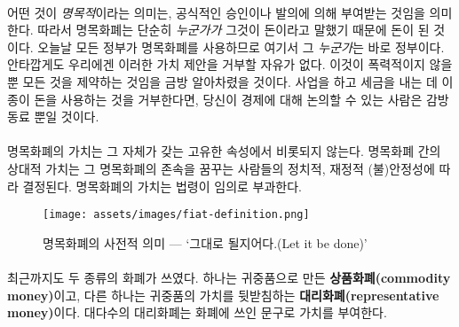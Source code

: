 \paragraph{}
어떤 것이 \textit{명목적}이라는 의미는, 공식적인 승인이나 발의에 의해 부여받는 것임을 의미한다. 
따라서 명목화폐는 단순히 \textit{누군가가} 그것이 돈이라고 말했기 때문에 돈이 된 것이다. 
오늘날 모든 정부가 명목화폐를 사용하므로 여기서 그 \textit{누군가}는 바로 정부이다. 
안타깝게도 우리에겐 이러한 가치 제안을 거부할 자유가 없다.
이것이 폭력적이지 않을 뿐 모든 것을 제약하는 것임을 금방 알아차렸을 것이다.
사업을 하고 세금을 내는 데 이 종이 돈을 사용하는 것을 거부한다면,
당신이 경제에 대해 논의할 수 있는 사람은 감방 동료 뿐일 것이다.

\begin{comment}
	The value of fiat money does not stem from its inherent properties. How
	good a certain type of fiat money is, is only correlated to the
	political and fiscal (in)stability of those who dream it into existence.
	Its value is imposed by decree, arbitrarily.
\end{comment}

\paragraph{}
명목화폐의 가치는 그 자체가 갖는 고유한 속성에서 비롯되지 않는다.
명목화폐 간의 상대적 가치는 그 명목화폐의 존속을 꿈꾸는 사람들의 정치적, 재정적 (불)안정성에 따라 결정된다.
명목화폐의 가치는 법령이 임의로 부과한다.

\begin{figure}
	\centering
	\texttt{[image: assets/images/fiat-definition.png]}
	\caption{명목화폐의 사전적 의미 --- `그대로 될지어다.(Let it be done)'}
	\label{fig:fiat-definition}
\end{figure}

\paragraph{}
최근까지도 두 종류의 화폐가 쓰였다.
하나는 귀중품으로 만든 \textbf{상품화폐(commodity money)}이고, 
다른 하나는 귀중품의 가치를 뒷받침하는 \textbf{대리화폐(representative money)}이다.
대다수의 대리화폐는 화폐에 쓰인 문구로 가치를 부여한다.

